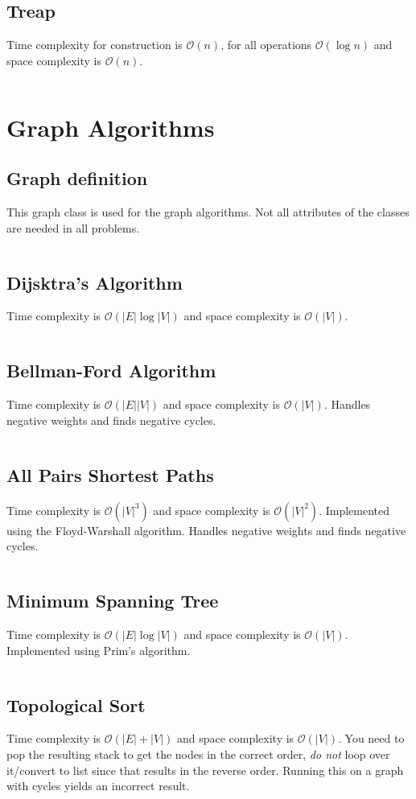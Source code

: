 \documentclass[8pt,a4paper,landscape,oneside]{amsart}
\newcommand{\code}[1]{\inputminted[fontsize=\normalsize,baselinestretch=1]{java}{code/#1}}
\newcommand{\bigO}{\mathcal{O}}
\begin{document}
\begin{multicols*}{3}
  \subsection{Treap}
  Time complexity for construction is $\bigO(n)$, for all operations $\bigO(\log{n})$ and space complexity is $\bigO(n)$.
  \code{Structures/Treap.java}
  
  
\section{Graph Algorithms}
  \subsection{Graph definition}
  This graph class is used for the graph algorithms. Not all attributes of the classes are needed in all problems.
  \code{Graphs/Graph.java}
  
  \subsection{Dijsktra's Algorithm}
  Time complexity is $\bigO(|E| \log{|V|})$ and space complexity is $\bigO(|V|)$.
  \code{Graphs/Dijkstras.java}
  
  \subsection{Bellman-Ford Algorithm}
  Time complexity is $\bigO(|E||V|)$ and space complexity is $\bigO(|V|)$. Handles negative weights and finds negative cycles.
  \code{Graphs/BellmanFord.java}
  
  \subsection{All Pairs Shortest Paths}
  Time complexity is $\bigO(|V|^3)$ and space complexity is $\bigO(|V|^2)$. Implemented using the Floyd-Warshall algorithm. Handles negative weights and finds negative cycles.
  \code{Graphs/FloydWarshall.java}
  
  \subsection{Minimum Spanning Tree}
  Time complexity is $\bigO(|E| \log{|V|})$ and space complexity is $\bigO(|V|)$. Implemented using Prim's algorithm.
  \code{Graphs/MST.java}
  
  \subsection{Topological Sort}
  Time complexity is $\bigO(|E| + |V|)$ and space complexity is $\bigO(|V|)$. You need to pop the resulting stack to get the nodes in the correct order, \textit{do not} loop over it/convert to list since that results in the reverse order. Running this on a graph with cycles yields an incorrect result.
  \code{Graphs/TopologicalSort.java}
  

\end{multicols*}
\end{document}
